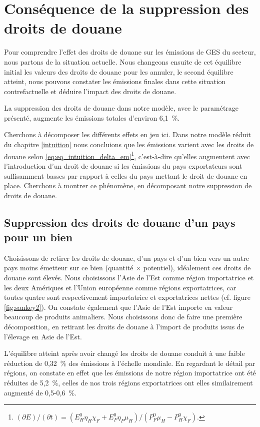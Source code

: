 \section{Conséquence de la suppression des droits de douane}

Pour comprendre l'effet des droits de douane sur les émissions de GES du secteur, nous partons de la situation actuelle. Nous changeons ensuite de cet équilibre initial les valeurs des droits de douane pour les annuler, le second équilibre atteint, nous pouvons constater les émissions finales dans cette situation contrefactuelle et déduire l'impact des droits de douane.

La suppression des droits de douane dans notre modèle, avec le paramétrage présenté, augmente les émissions totales d'environ 6,1~\%.

Cherchons à décomposer les différents effets en jeu ici. Dans notre modèle réduit du chapitre \ref{intuition} nous concluions que les émissions varient avec les droits de douane selon \ref{eq:eq_intuition_delta_em}\footnote{$\left({\partial E}\right)/\left( {\partial t} \right) = \left( {E_H^0 \eta_H \chi_F + E_F^0 \eta_F \mu_H} \right)/\left( {P_F^0 \mu_H - P_H^0 \chi_F} \right).$}, c'est-à-dire qu'elles augmentent avec l'introduction d'un droit de douane si les émissions du pays exportateurs sont suffisamment basses par rapport à celles du pays mettant le droit de douane en place. Cherchons à montrer ce phénomène, en décomposant notre suppression de droits de douane.

\subsection{Suppression des droits de douane d'un pays pour un bien}\label{subsec:ae_anp}

Choisissons de retirer les droits de douane, d'un pays et d'un bien vers un autre pays moins émetteur sur ce bien (quantité $\times$ potentiel), idéalement ces droits de douane sont élevés. Nous choisissons l'Asie de l'Est comme région importatrice et les deux Amériques et l'Union européenne comme régions exportatrices, car toutes quatre sont respectivement importatrice et exportatrices nettes (cf. figure \ref{fig:sankey2}). On constate également que l'Asie de l'Est importe en valeur beaucoup de produits animaliers. Nous choisissons donc de faire une première décomposition, en retirant les droits de douane à l'import de produits issus de l'élevage en Asie de l'Est.

L'équilibre atteint après avoir changé les droits de douane conduit à une faible réduction de 0,32~\% des émissions à l'échelle mondiale. En regardant le détail par régions, on constate en effet que les émissions de notre région importatrice ont été réduites de 5,2~\%, celles de nos trois régions exportatrices ont elles similairement augmenté de 0,5-0,6~\%.

